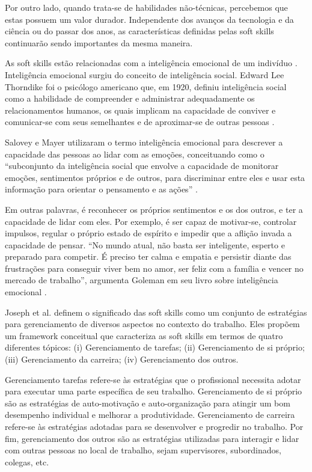 Por outro lado, quando trata-se de habilidades não-técnicas, percebemos que estas possuem um valor durador. Independente dos avanços da tecnologia e da ciência ou do passar dos anos, as características definidas pelas soft skills continuarão sendo importantes da mesma maneira.

As soft skills estão relacionadas com a inteligência emocional de um indivíduo \cite{hjyunus:12}. Inteligência emocional surgiu do conceito de inteligência social. Edward Lee Thorndike foi o psicólogo americano que, em 1920, definiu inteligência social como a habilidade de compreender e administrar adequadamente os relacionamentos humanos, os quais implicam na capacidade de conviver e comunicar-se com seus semelhantes e de aproximar-se de outras pessoas \cite{thornlike:20}.

Salovey e Mayer utilizaram o termo inteligência emocional para descrever a capacidade das pessoas ao lidar com as emoções, conceituando como o ``subconjunto da inteligência social que envolve a capacidade de monitorar emoções, sentimentos próprios e de outros, para discriminar entre eles e usar esta informação para orientar o pensamento e as ações'' \cite{salovey:90}.

Em outras palavras, é reconhecer os próprios sentimentos e os dos outros, e ter a capacidade de lidar com eles. Por exemplo, é ser capaz de motivar-se, controlar impulsos, regular o próprio estado de espírito e impedir que a aflição invada a capacidade de pensar. ``No mundo atual, não basta ser inteligente, esperto e preparado para competir. É preciso ter calma e empatia e persistir diante das frustrações para conseguir viver bem no amor, ser feliz com a família e vencer no mercado de trabalho'', argumenta Goleman em seu livro sobre inteligência emocional \cite{goleman:07}.

Joseph et al. \cite{joseph:99} \cite{joseph:10} definem o significado das soft skills como um conjunto de estratégias para gerenciamento de diversos aspectos no contexto do trabalho. Eles propõem um framework conceitual que caracteriza as soft skills em termos de quatro diferentes tópicos: (i) Gerenciamento de tarefas; (ii) Gerenciamento de si próprio; (iii) Gerenciamento da carreira; (iv) Gerenciamento dos outros.

Gerenciamento tarefas refere-se às estratégias que o profissional necessita adotar para executar uma parte específica de seu trabalho. Gerenciamento de si próprio são as estratégias de auto-motivação e auto-organização para atingir um bom desempenho individual e melhorar a produtividade. Gerenciamento de carreira refere-se às estratégias adotadas para se desenvolver e progredir no trabalho. Por fim, gerenciamento dos outros são as estratégias utilizadas para interagir e lidar com outras pessoas no local de trabalho, sejam supervisores, subordinados, colegas, etc.

